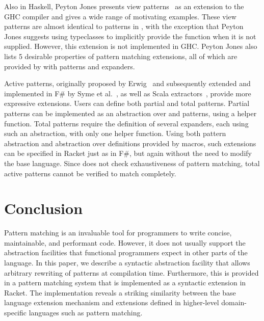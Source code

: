 \documentclass[onecolumn]{llncs}
\newcommand{\sectionNewpage}{}
\newcommand{\Scribtexttt}[1]{{\texttt{#1}}}
\newcommand{\badlink}[1]{#1}
\newcommand{\SColorize}[2]{\color{#1}{#2}}
\newcommand{\inColor}[2]{{\Scribtexttt{\SColorize{#1}{#2}}}}
\newcommand{\RktKw}[1]{{\SColorize{black}{\Scribtexttt{#1}}}} \newcommand{\RktStxLink}[1]{\RktKw{#1}}
\newcommand{\RktSym}[1]{\inColor{IdentifierColor}{#1}}
\newcommand{\RktValLink}[1]{\inColor{blue}{#1}}
\renewcommand{\sectionNewpage}{}
\begin{document}
Also in Haskell, Peyton Jones presents view
patterns~\cite{spj:view-patterns} as an extension to the GHC compiler
and gives a wide range of motivating examples.  These view patterns
are almost identical to \RktSym{\badlink{\RktValLink{app}}} patterns in \RktSym{\RktStxLink{match}}, with the exception
that Peyton Jones suggests using typeclasses to implicitly provide the
function when it is not supplied.  However, this extension is not
implemented in GHC.  Peyton Jones also lists 5 desirable properties of
pattern matching extensions, all of which are provided by \RktSym{\RktStxLink{match}} with
\RktSym{\badlink{\RktValLink{app}}} patterns and \RktSym{\RktStxLink{match}} expanders.

Active patterns, originally proposed by
Erwig~\cite{erwig:active-patterns} and subsequently extended and
implemented in F\# by Syme et al.~\cite{snm:active-patterns}, as well
as Scala extractors~\cite{scala-extractors}, provide
more expressive extensions.  Users can define both partial and total
patterns.  Partial patterns can be implemented as an abstraction over
\RktSym{\badlink{\RktValLink{app}}} and \RktKw{{\hbox{\texttt{?}}}} patterns, using a helper function.  Total patterns
require the definition of several \RktSym{\RktStxLink{match}} expanders, each using such an
abstraction, with only one helper function.  Using both pattern
abstraction and abstraction over definitions provided by macros, such extensions
can be specified in Racket just as in F\#, but again without the need
to modify the base language.   Since \RktSym{\RktStxLink{match}} does not check
exhaustiveness of pattern matching, total active patterns cannot be
verified to match completely.

\sectionNewpage

\section[Conclusion]{Conclusion}\label{t:x28part_x22Conclusionx22x29}

Pattern matching is an invaluable tool for programmers to write
concise, maintainable, and performant code.  However, it does not
usually support the abstraction facilities that functional programmers
expect in other parts of the language.  In this paper, we describe a
syntactic abstraction facility that allows arbitrary rewriting of
patterns at compilation time.  Furthermore, this is provided in a
pattern matching system that is implemented as a syntactic extension
in Racket.  The implementation reveals a striking similarity between
the base language extension mechanism and extensions defined in
higher{-}level domain{-}specific languages such as pattern matching.
\end{document}
